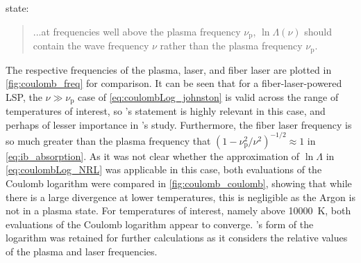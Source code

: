         \textcite{johnstonCorrectValuesHighfrequency1973} state:
        \begin{quote}
            ...at frequencies well above the plasma frequency $\nu_\mathrm{p}$, $\ln{\Lambda}(\nu)$ should contain the wave frequency $\nu$ rather than the plasma frequency $\nu_\mathrm{p}$.
        \end{quote}
        The respective frequencies of the plasma,  laser, and fiber laser are plotted in \autoref{fig:coulomb_freq} for comparison. It can be seen that for a fiber-laser-powered LSP, the $\nu \gg \nu_\mathrm{p}$ case of \autoref{eq:coulombLog_johnston} is valid across the range of temperatures of interest, so \citeauthor{johnstonCorrectValuesHighfrequency1973}'s statement is highly relevant in this case, and perhaps of lesser importance in \citeauthor{nassarInvestigationLasersustainedPlasma2012}'s study. Furthermore, the fiber laser frequency is so much greater than the plasma frequency that $(1-\nu_\mathrm{p}^2/\nu^2)^{-1/2} \approx 1$ in \autoref{eq:ib_absorption}. As it was not clear whether the approximation of $\ln{\Lambda}$ in \autoref{eq:coulombLog_NRL} was applicable in this case, both evaluations of the Coulomb logarithm were compared in \autoref{fig:coulomb_coulomb}, showing that while there is a large divergence at lower temperatures, this is negligible as the Argon is not in a plasma state. For temperatures of interest, namely above \qty{10000}{K}, both evaluations of the Coulomb logarithm appear to converge. \citeauthor{johnstonCorrectValuesHighfrequency1973}'s form of the logarithm was retained for further calculations as it considers the relative values of the plasma and laser frequencies.

